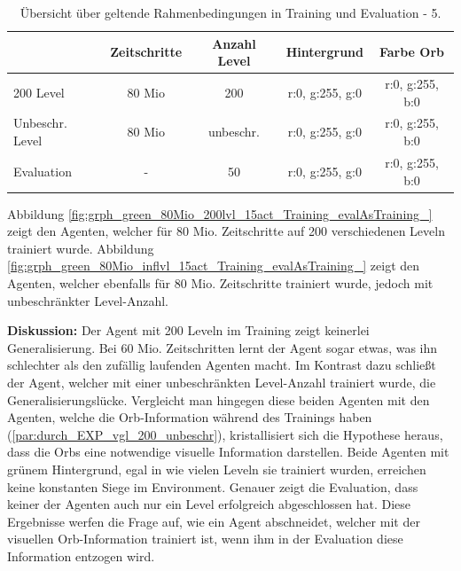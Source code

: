 \begin{center}
 \begin{table}[htb!]
 \begin{center}
  \begin{tabular}{ l c c c c }
    \hline
			       	& Zeitschritte 	& Anzahl Level 	& Hintergrund	 	& Farbe Orb \\ \hline \hline
     200 Level     	& 80 Mio       	& 200		&  r:0, g:255, g:0	& r:0, g:255, b:0 \\ \hline
     Unbeschr. Level   	& 80 Mio       	& unbeschr.	&  r:0, g:255, g:0	& r:0, g:255, b:0 \\ \hline
     Evaluation 		& - 	           	& 50			&  r:0, g:255, g:0 	& r:0, g:255, b:0 \\ \hline
    \hline
  \end{tabular}
  \caption{Übersicht über geltende Rahmenbedingungen in Training und Evaluation - 5.}
  \label{tab:tab_durch_EXP_trainSetting5}
  \end{center}
 \end{table}
\end{center} 

Abbildung \ref{fig:grph_green_80Mio_200lvl_15act_Training_evalAsTraining_} zeigt den Agenten, welcher für 80 Mio. Zeitschritte auf 200 verschiedenen Leveln trainiert wurde. Abbildung \ref{fig:grph_green_80Mio_inflvl_15act_Training_evalAsTraining_} zeigt den Agenten, welcher ebenfalls für 80 Mio. Zeitschritte trainiert wurde, jedoch mit unbeschränkter Level-Anzahl. 

\textbf{Diskussion:} Der Agent mit 200 Leveln im Training zeigt keinerlei Generalisierung. Bei 60 Mio. Zeitschritten lernt der Agent sogar etwas, was ihn schlechter als den zufällig laufenden Agenten macht. Im Kontrast dazu schließt der Agent, welcher mit einer unbeschränkten Level-Anzahl trainiert wurde, die Generalisierungslücke. Vergleicht man hingegen diese beiden Agenten mit den Agenten, welche die Orb-Information während des Trainings haben (\ref{par:durch_EXP_vgl_200_unbeschr}), kristallisiert sich die Hypothese heraus, dass die Orbs eine notwendige visuelle Information darstellen. Beide Agenten mit grünem Hintergrund, egal in wie vielen Leveln sie trainiert wurden, erreichen keine konstanten Siege im Environment. Genauer zeigt die Evaluation, dass keiner der Agenten auch nur ein Level erfolgreich abgeschlossen hat. Diese Ergebnisse werfen die Frage auf, wie ein Agent abschneidet, welcher mit der visuellen Orb-Information trainiert ist, wenn ihm in der Evaluation diese Information entzogen wird. \\


